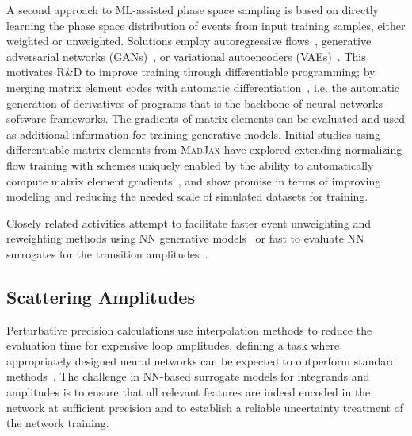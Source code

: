\documentclass[submission,Phys]{SciPost}
\begin{document}
A second approach to ML-assisted phase space sampling is based on directly learning the phase space distribution of events from input training samples, either weighted or unweighted. Solutions employ autoregressive flows~\cite{Verheyen:2020bjw},  generative adversarial networks (GANs)~\cite{Butter:2019cae,DiSipio:2019imz,Otten:2019hhl,Choi:2021sku}, or variational autoencoders (VAEs)~\cite{Otten:2019hhl}. This motivates R\&D to improve training through differentiable programming; by merging matrix element codes with automatic differentiation~\cite{JMLR:v18:17-468}, i.e. the automatic generation of derivatives of programs that is the backbone of neural networks software frameworks. The gradients of matrix elements can be evaluated and used as additional information for training generative models. Initial studies using differentiable matrix elements from \textsc{MadJax} have explored extending normalizing flow training with schemes uniquely enabled by the ability to automatically compute matrix element gradients~\cite{HeinrichKagan:2022}, and show promise in terms of improving modeling and reducing the needed scale of simulated datasets for training.

Closely related activities attempt to facilitate faster event unweighting and reweighting methods using NN generative models~\cite{Backes:2020vka,Winterhalder:2021ave} or fast to evaluate NN surrogates for the transition amplitudes~\cite{Danziger:2021eeg}. 


\subsection{Scattering Amplitudes}
\label{sec:generators_amp}

Perturbative precision calculations use interpolation methods to reduce the evaluation time for expensive loop amplitudes, defining a task where appropriately designed neural networks can be expected to outperform standard methods~\cite{Bishara:2019iwh,Badger:2020uow,Aylett-Bullock:2021hmo,Maitre:2021uaa,Danziger:2021eeg}. The challenge in NN-based surrogate models for integrands and amplitudes is to ensure that all relevant features are indeed encoded in the network at sufficient precision and to establish a reliable uncertainty treatment of the network training. 
\end{document}
